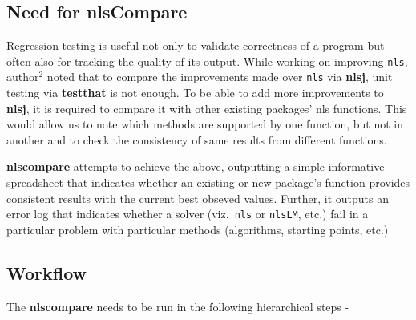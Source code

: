 \hypertarget{need-for-nlscompare}{%
\subsection{Need for nlsCompare}\label{need-for-nlscompare}}

Regression testing is useful not only to validate correctness of a
program but often also for tracking the quality of its output. While
working on improving \texttt{nls}, author\(^2\) noted that to compare
the improvements made over \texttt{nls} via \textbf{nlsj}, unit testing
via \textbf{testthat} is not enough. To be able to add more improvements
to \textbf{nlsj}, it is required to compare it with other existing
packages' nls functions. This would allow us to note which methods are
supported by one function, but not in another and to check the
consistency of same results from different functions.

\textbf{nlscompare} attempts to achieve the above, outputting a simple
informative spreadsheet that indicates whether an existing or new
package's function provides consistent results with the current best
obseved values. Further, it outputs an error log that indicates whether
a solver (viz.~\texttt{nls} or \texttt{nlsLM}, etc.) fail in a
particular problem with particular methods (algorithms, starting points,
etc.)

\hypertarget{workflow}{%
\subsection{Workflow}\label{workflow}}

The \textbf{nlscompare} needs to be run in the following hierarchical
steps -

